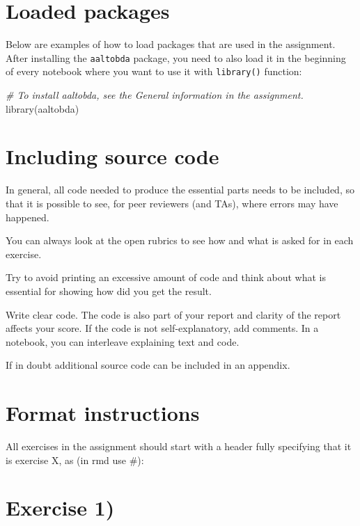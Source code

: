 \documentclass[
]{article}
\newenvironment{Shaded}{\begin{snugshade}}{\end{snugshade}}
\newcommand{\CommentTok}[1]{\textcolor[rgb]{0.56,0.35,0.01}{\textit{#1}}}
\newcommand{\FunctionTok}[1]{\textcolor[rgb]{0.00,0.00,0.00}{#1}}
\newcommand{\NormalTok}[1]{#1}
\begin{document}
\hypertarget{loaded-packages}{%
\section{Loaded packages}\label{loaded-packages}}

Below are examples of how to load packages that are used in the
assignment. After installing the \texttt{aaltobda} package, you need to
also load it in the beginning of every notebook where you want to use it
with \texttt{library()} function:

\begin{Shaded}
\begin{Highlighting}[]
\CommentTok{\# To install aaltobda, see the General information in the assignment.}
\FunctionTok{library}\NormalTok{(aaltobda)}
\end{Highlighting}
\end{Shaded}

\hypertarget{including-source-code}{%
\section{Including source code}\label{including-source-code}}

In general, all code needed to produce the essential parts needs to be
included, so that it is possible to see, for peer reviewers (and TAs),
where errors may have happened.

You can always look at the open rubrics to see how and what is asked for
in each exercise.

Try to avoid printing an excessive amount of code and think about what
is essential for showing how did you get the result.

Write clear code. The code is also part of your report and clarity of
the report affects your score. If the code is not self-explanatory, add
comments. In a notebook, you can interleave explaining text and code.

If in doubt additional source code can be included in an appendix.

\hypertarget{format-instructions}{%
\section{Format instructions}\label{format-instructions}}

All exercises in the assignment should start with a header fully
specifying that it is exercise X, as (in rmd use \#):

\hypertarget{exercise-1}{%
\section{Exercise 1)}\label{exercise-1}}
\end{document}
